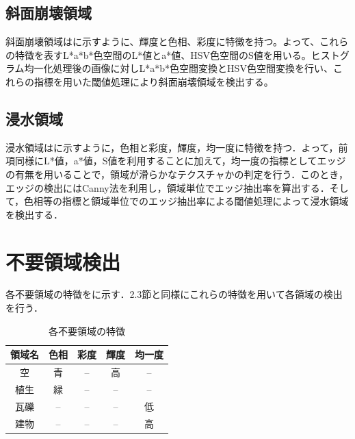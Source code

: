 \documentclass[../Thesis]{subfiles}
\begin{document}


\subsection{斜面崩壊領域}
  斜面崩壊領域はに示すように、輝度と色相、彩度に特徴を持つ。よって、これらの特徴を表すL*a*b*色空間のL*値とa*値、HSV色空間のS値を用いる。ヒストグラム均一化処理後の画像に対しL*a*b*色空間変換とHSV色空間変換を行い、これらの指標を用いた閾値処理により斜面崩壊領域を検出する。


\subsection{浸水領域}
  浸水領域はに示すように，色相と彩度，輝度，均一度に特徴を持つ．よって，前項同様にL*値，a*値，S値を利用することに加えて，均一度の指標としてエッジの有無を用いることで，領域が滑らかなテクスチャかの判定を行う．このとき，エッジの検出にはCanny法を利用し，領域単位でエッジ抽出率を算出する．そして，色相等の指標と領域単位でのエッジ抽出率による閾値処理によって浸水領域を検出する．


\section{不要領域検出}
  各不要領域の特徴をに示す．2.3節と同様にこれらの特徴を用いて各領域の検出を行う．
  
	\begin{table}[b]
		\centering
		\caption{各不要領域の特徴}
		\label{tab02}
		\begin{tabular}{c c c c c}
			\hline
			領域名 & 色相 & 彩度 & 輝度 & 均一度 \\
			\hline
			\hline
			空 & 青 & -- & 高 & -- \\
			植生 & 緑 & -- & -- & -- \\
			瓦礫 & -- & -- & -- & 低 \\
			建物 & -- & -- & -- & 高 \\ \hline
		\end{tabular}
	\end{table}
\end{document}

